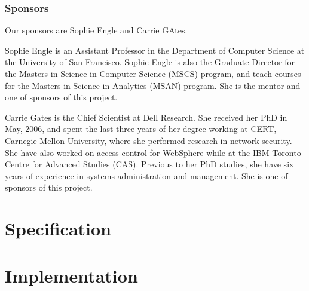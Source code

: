\documentclass[paper=a4, fontsize=11pt]{report} %
\begin{document}
\subsection{Sponsors} %
\label{sub:sponsors}
Our sponsors are Sophie Engle and Carrie GAtes.

Sophie Engle is an Assistant Professor in the Department of Computer Science at the University of San Francisco. Sophie Engle is also the Graduate Director for the Masters in Science in Computer Science (MSCS) program, and teach courses for the Masters in Science in Analytics (MSAN) program. She is the mentor and one of sponsors of this project.

Carrie Gates is the Chief Scientist at Dell Research. She received her PhD in May, 2006, and spent the last three years of her degree working at CERT, Carnegie Mellon University, where she performed research in network security. She have also worked on access control for WebSphere while at the IBM Toronto Centre for Advanced Studies (CAS). Previous to her PhD studies, she have six years of experience in systems administration and management. She is one of sponsors of this project.









\chapter{Specification} %
\label{cha:specification}







\chapter{Implementation} %
\label{cha:implementation}

\end{document}
